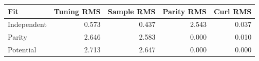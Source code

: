 \begin{tabular}{lrrrr}
\toprule
Fit & Tuning RMS & Sample RMS & Parity RMS & Curl RMS\\
\midrule
Independent & 0.573 & 0.437 & 2.543 & 0.037 \\
Parity & 2.646 & 2.583 & 0.000 & 0.010 \\
Potential & 2.713 & 2.647 & 0.000 & 0.000 \\
\bottomrule
\end{tabular}
